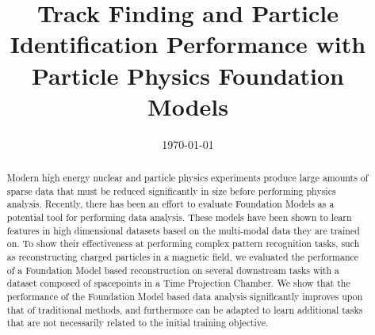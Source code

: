 \documentclass[aps,physrev,twocolumn,superscriptaddress]{revtex4-2}
\begin{document}

%

\title{Track Finding and Particle Identification Performance with Particle Physics Foundation Models}


\author{}


\date{\today}

\begin{abstract}
Modern high energy nuclear and particle physics experiments produce large amounts of sparse data that must be reduced significantly in size before performing physics analysis. Recently, there has been an effort to evaluate Foundation Models as a potential tool for performing data analysis. These models have been shown to learn features in high dimensional datasets based on the multi-modal data they are trained on. To show their effectiveness at performing complex pattern recognition tasks, such as reconstructing charged particles in a magnetic field, we evaluated the performance of a Foundation Model based reconstruction on several downstream tasks with a dataset composed of spacepoints in a Time Projection Chamber. We show that the performance of the Foundation Model based data analysis significantly improves upon that of traditional methods, and furthermore can be adapted to learn additional tasks that are not necessarily related to the initial training objective.
\end{abstract}
\end{document}
